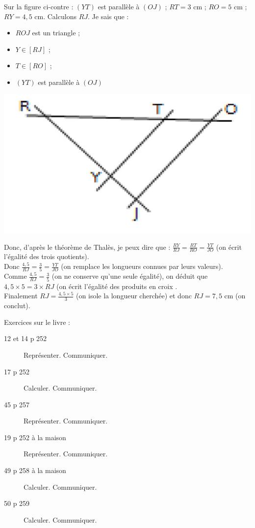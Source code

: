 \documentclass[openany]{book}
\begin{document}
\begin{Ex}

\begin{multicols}{2}
Sur la figure ci-contre :
$\left(YT\right)$ est parallèle à $\left(OJ\right)$ ;
$RT = 3$ cm ;
$RO = 5$ cm ;
$RY = 4,5$ cm.
Calculons $RJ$.
Je sais que :
\begin{itemize}
\item $ROJ$ est un triangle ;
\item $Y \in \left[RJ\right]$ ;
\item $T \in \left[RO\right]$ ;
\item $\left(YT\right)$ est parallèle à $\left(OJ\right)$
\end{itemize}
\includegraphics[scale=0.3]{cours1.jpg}  
\end{multicols}


Donc, d'après le théorème de Thalès, je peux dire que : $\frac{RY}{RJ}=\frac{RT}{RO}=\frac{YT}{JO}$ (on écrit l'égalité des trois quotients).
\\Donc $\frac{4,5}{RJ}=\frac{3}{5}=\frac{YT}{JO}$ (on remplace les longueurs connues par leurs valeurs).
\\Comme $\frac{4,5}{RJ}=\frac{3}{5}$ (on ne conserve qu'une seule égalité), on déduit que $4,5 \times 5=3\times RJ$ (on écrit l'égalité des \og produits en croix \fg{}.
\\Finalement $RJ= \frac{4,5 \times 5}{3}$  (on \og isole \fg{} la longueur cherchée) et donc $RJ=7,5$ cm (on conclut).
\end{Ex}


Exercices sur le livre :

\begin{description}
\item[12 et 14 p 252] Représenter. Communiquer.
\item[17 p 252] Calculer. Communiquer.
\item[45 p 257] Représenter. Communiquer.
\item[19 p 252 à la maison] Représenter. Communiquer.
\item[49 p 258 à la maison] Calculer. Communiquer.
\item[50 p 259] Calculer. Communiquer.
\end{description}
\end{document}
